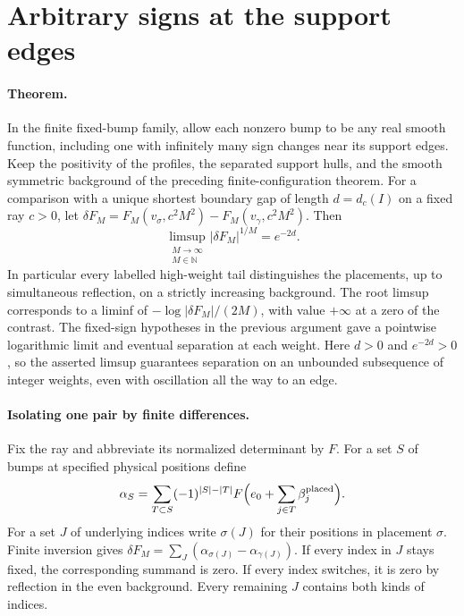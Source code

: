 \documentclass[11pt,letterpaper]{article}
\begin{document}
\section{Arbitrary signs at the support edges}

\paragraph{Theorem.}
In the finite fixed-bump family, allow each nonzero bump to be any real
smooth function, including one with infinitely many sign changes near its
support edges. Keep the positivity of the profiles, the separated support
hulls, and the smooth symmetric background of the preceding finite-configuration
theorem. For a comparison with a unique shortest boundary gap of length
\(d=d_c(I)\) on a fixed ray \(c>0\), let
\(\delta F_M=F_M(v_\sigma,c^2M^2)-F_M(v_\gamma,c^2M^2)\). Then
\[
 \limsup_{\substack{M\to\infty\\M\in{\mathbb N}}}
       |\delta F_M|^{1/M}=e^{-2d}.
\]
In particular every labelled high-weight tail distinguishes the placements,
up to simultaneous reflection, on a strictly increasing background.
The root limsup corresponds to a liminf of
\(-\log|\delta F_M|/(2M)\), with value \(+\infty\) at a zero of the
contrast. The fixed-sign hypotheses in the previous argument gave a
pointwise logarithmic limit and eventual separation at each weight.
Here \(d>0\) and \(e^{-2d}>0\), so the asserted limsup guarantees
separation on an unbounded subsequence of integer weights, even with
oscillation all the way to an edge.

\paragraph{Isolating one pair by finite differences.}
Fix the ray and abbreviate its normalized determinant by \(F\). For a
set \(S\) of bumps at specified physical positions define
\[
 \alpha_S=\sum_{T\subset S}(-1)^{|S|-|T|}
             F\Big(e_0+\sum_{j\in T}\beta_j^{\rm placed}\Big).
\]
For a set \(J\) of underlying indices write \(\sigma(J)\) for their
positions in placement \(\sigma\). Finite inversion gives
\(\delta F_M=\sum_J(\alpha_{\sigma(J)}-\alpha_{\gamma(J)})\).
If every index in \(J\) stays fixed, the corresponding summand is
zero. If every index switches, it is zero by reflection in the even
background. Every remaining \(J\) contains both kinds of indices.
\end{document}
